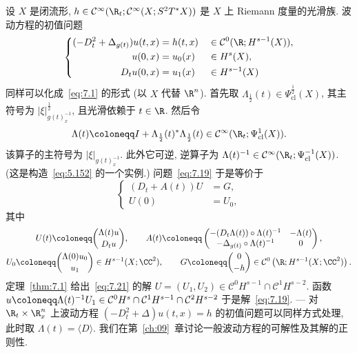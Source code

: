 \begin{example}\label{eg:7.5}
设 $X$ 是闭流形, $h \in \Smooth(\R_t; \Smooth(X; S^2 T^* X))$ 是 $X$ 上 Riemann 度量的光滑族. 波动方程的初值问题
\begin{equation}\label{eq:7.19}
    \left\{
    \begin{aligned}
        (-D_t^2 + \Delta_{g(t)}) u(t, x) &= h(t, x) &&\in \mathcal{C}^0(\R; H^{s-1}(X)), \\
        u(0, x) &= u_0(x) &&\in H^s(X), \\
        D_t u(0, x) &= u_1(x) &&\in H^{s-1}(X)
    \end{aligned}
    \right.
\end{equation}
同样可以化成~\eqref{eq:7.1} 的形式 (以 $X$ 代替 $\R^n$). 首先取 $\Lambda_{\frac{1}{2}}(t) \in \Psi^{\frac{1}{2}}_{\mathrm{cl}}(X)$, 其主符号为 $| \xi |^{\frac{1}{2}}_{g(t)_x^{-1}}$, 且光滑依赖于 $t \in \R$. 然后令
\begin{equation}\label{eq:7.20}
    \Lambda(t) \defeq I + \Lambda_{\frac{1}{2}}(t)^* \Lambda_{\frac{1}{2}}(t) \in \Smooth(\R_t; \Psi^1_{\mathrm{cl}}(X)).
\end{equation}
该算子的主符号为 $| \xi |_{g(t)_x^{-1}}$. 此外它可逆, 逆算子为 $\Lambda(t)^{-1} \in \Smooth(\R_t; \Psi^{-1}_{\mathrm{cl}}(X))$. (这是构造~\eqref{eq:5.152} 的一个实例.) 问题~\eqref{eq:7.19} 于是等价于
\begin{equation}\label{eq:7.21}
    \left\{
    \begin{aligned}
        (D_t + A(t)) U &= G, \\
        U(0) &= U_0,
    \end{aligned}
    \right.
\end{equation}
其中
\begin{equation}\label{eq:7.22}
    \begin{gathered}
        U(t) \defeq \binom{\Lambda(t) u}{D_t u}, \qquad
        A(t) \defeq \begin{pmatrix} -(D_t \Lambda(t)) \circ \Lambda(t)^{-1} & -\Lambda(t) \\ -\Delta_{g(t)} \circ \Lambda(t)^{-1} & 0 \end{pmatrix}, \\
        U_0 \defeq \binom{\Lambda(0) u_0}{u_1} \in H^{s-1}(X; \CC^2), \qquad
        G \defeq \binom{0}{-h} \in \mathcal{C}^0\left( \R; H^{s-1}(X; \CC^2) \right).
    \end{gathered}
\end{equation}
定理~\ref{thm:7.1} 给出~\eqref{eq:7.21} 的解 $U = (U_1, U_2) \in \mathcal{C}^0 H^{s-1} \cap \mathcal{C}^1 H^{s-2}$. 函数 $u \defeq \Lambda(t)^{-1} U_1 \in \mathcal{C}^0 H^s \cap \mathcal{C}^1 H^{s-1} \cap \mathcal{C}^2 H^{s-2}$ 于是解~\eqref{eq:7.19}. --- 对 $\R_t \times \R^n_x$ 上波动方程 $(-D_t^2 + \Delta)u(t, x) = h$ 的初值问题可以同样方式处理, 此时取 $\Lambda(t) = \langle D \rangle$. 我们在第~\ref{ch:09}~章讨论一般波动方程的可解性及其解的正则性.
\end{example}



